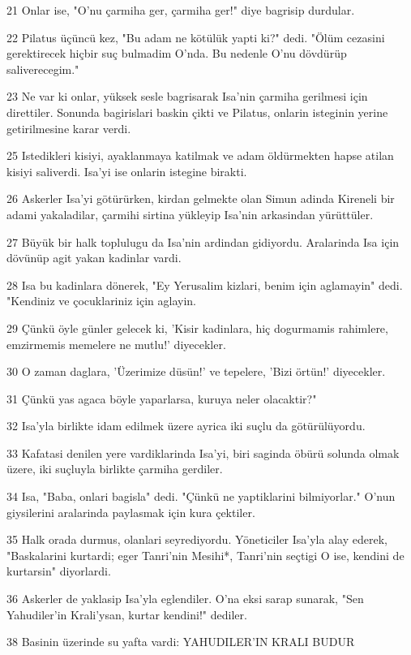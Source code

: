 \par 21 Onlar ise, "O'nu çarmiha ger, çarmiha ger!" diye bagrisip durdular.
\par 22 Pilatus üçüncü kez, "Bu adam ne kötülük yapti ki?" dedi. "Ölüm cezasini gerektirecek hiçbir suç bulmadim O'nda. Bu nedenle O'nu dövdürüp saliverecegim."
\par 23 Ne var ki onlar, yüksek sesle bagrisarak Isa'nin çarmiha gerilmesi için direttiler. Sonunda bagirislari baskin çikti ve Pilatus, onlarin isteginin yerine getirilmesine karar verdi.
\par 25 Istedikleri kisiyi, ayaklanmaya katilmak ve adam öldürmekten hapse atilan kisiyi saliverdi. Isa'yi ise onlarin istegine birakti.
\par 26 Askerler Isa'yi götürürken, kirdan gelmekte olan Simun adinda Kireneli bir adami yakaladilar, çarmihi sirtina yükleyip Isa'nin arkasindan yürüttüler.
\par 27 Büyük bir halk toplulugu da Isa'nin ardindan gidiyordu. Aralarinda Isa için dövünüp agit yakan kadinlar vardi.
\par 28 Isa bu kadinlara dönerek, "Ey Yerusalim kizlari, benim için aglamayin" dedi. "Kendiniz ve çocuklariniz için aglayin.
\par 29 Çünkü öyle günler gelecek ki, 'Kisir kadinlara, hiç dogurmamis rahimlere, emzirmemis memelere ne mutlu!' diyecekler.
\par 30 O zaman daglara, 'Üzerimize düsün!' ve tepelere, 'Bizi örtün!' diyecekler.
\par 31 Çünkü yas agaca böyle yaparlarsa, kuruya neler olacaktir?"
\par 32 Isa'yla birlikte idam edilmek üzere ayrica iki suçlu da götürülüyordu.
\par 33 Kafatasi denilen yere vardiklarinda Isa'yi, biri saginda öbürü solunda olmak üzere, iki suçluyla birlikte çarmiha gerdiler.
\par 34 Isa, "Baba, onlari bagisla" dedi. "Çünkü ne yaptiklarini bilmiyorlar." O'nun giysilerini aralarinda paylasmak için kura çektiler.
\par 35 Halk orada durmus, olanlari seyrediyordu. Yöneticiler Isa'yla alay ederek, "Baskalarini kurtardi; eger Tanri'nin Mesihi*, Tanri'nin seçtigi O ise, kendini de kurtarsin" diyorlardi.
\par 36 Askerler de yaklasip Isa'yla eglendiler. O'na eksi sarap sunarak, "Sen Yahudiler'in Krali'ysan, kurtar kendini!" dediler.
\par 38 Basinin üzerinde su yafta vardi: YAHUDILER'IN KRALI BUDUR
